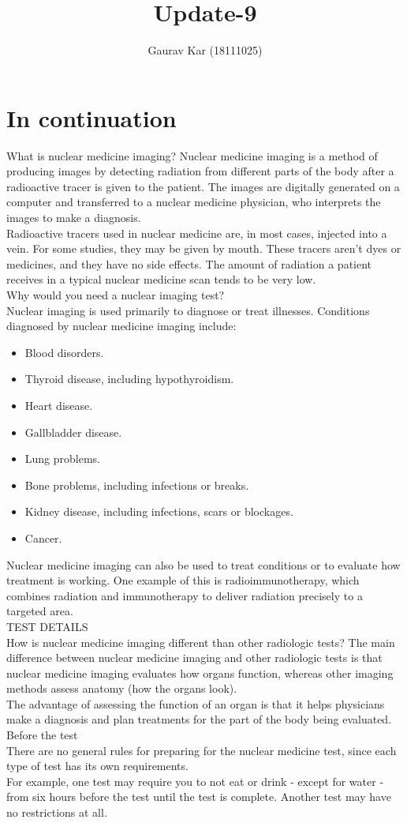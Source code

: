 \documentclass{article}
\title{Update-9}
\author{Gaurav Kar (18111025)}
\date{}
\begin{document}
\maketitle

\section{In continuation}
What is nuclear medicine imaging?
Nuclear medicine imaging is a method of producing images by detecting radiation from different parts of the body after a radioactive tracer is given to the patient. The images are digitally generated on a computer and transferred to a nuclear medicine physician, who interprets the images to make a diagnosis.\\Radioactive tracers used in nuclear medicine are, in most cases, injected into a vein. For some studies, they may be given by mouth. These tracers aren’t dyes or medicines, and they have no side effects. The amount of radiation a patient receives in a typical nuclear medicine scan tends to be very low.\\Why would you need a nuclear imaging test?\\Nuclear imaging is used primarily to diagnose or treat illnesses. Conditions diagnosed by nuclear medicine imaging include:
\begin{itemize}
\item Blood disorders.
\item Thyroid disease, including hypothyroidism.
\item Heart disease.
\item Gallbladder disease.
\item Lung problems.
\item Bone problems, including infections or breaks.
\item Kidney disease, including infections, scars or blockages.
\item Cancer.
\end{itemize}
Nuclear medicine imaging can also be used to treat conditions or to evaluate how treatment is working. One example of this is radioimmunotherapy, which combines radiation and immunotherapy to deliver radiation precisely to a targeted area.\\TEST DETAILS\\How is nuclear medicine imaging different than other radiologic tests?
The main difference between nuclear medicine imaging and other radiologic tests is that nuclear medicine imaging evaluates how organs function, whereas other imaging methods assess anatomy (how the organs look).\\The advantage of assessing the function of an organ is that it helps physicians make a diagnosis and plan treatments for the part of the body being evaluated.\\Before the test\\There are no general rules for preparing for the nuclear medicine test, since each type of test has its own requirements.\\For example, one test may require you to not eat or drink - except for water - from six hours before the test until the test is complete. Another test may have no restrictions at all.
\end{document}
